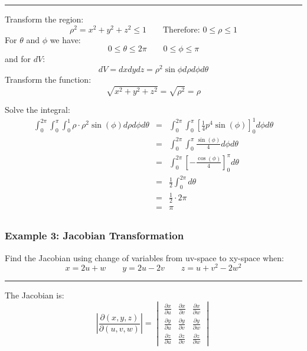 \noindent\rule{\textwidth}{1pt}

Transform the region:
$$\rho^2=x^2+y^2+z^2\leq 1\qquad \text{Therefore: }0\leq\rho\leq 1$$
For $\theta$ and $\phi$ we have:
$$0\leq\theta\leq 2\pi\qquad 0\leq\phi\leq\pi$$
and for $dV$:
$$dV=dxdydz=\rho^2\sin\phi d\rho d\phi d\theta$$
Transform the function:
$$\sqrt{x^2+y^2+z^2}=\sqrt{\rho^2}=\rho$$

Solve the integral:
\begin{eqnarray*}
  \int_0^{2\pi}\int_0^\pi\int_0^1\rho\cdot\rho^2\sin(\phi) d\rho d\phi d\theta&=&\int_0^{2\pi}\int_0^\pi\left[\frac{1}{4} p^4 \sin (\phi)\right]^1_0d\phi d\theta\\
                                                                              &=& \int_0^{2\pi}\int_0^\pi\frac{\sin (\phi)}{4}d\phi d\theta\\
                                                                              &=& \int_0^{2\pi}\left[-\frac{\cos (\phi)}{4}\right]_0^\pi d\theta\\
                                                                              &=& \frac{1}{2}\int_0^{2\pi}d\theta\\
                                                                              &=& \frac{1}{2}\cdot 2\pi\\
                                                                              &=& \boxed{\pi}\\
\end{eqnarray*}

\subsubsection{Example 3: Jacobian Transformation}
Find the Jacobian using change of variables from uv-space to xy-space when:
$$x=2u+w\qquad y=2u-2v\qquad z=u+v^2-2w^2$$

\rule{\textwidth}{1pt}

The Jacobian is:
$$\left|\frac{\partial(x,y,z)}{\partial(u,v,w)}\right|=
\begin{vmatrix}
  \frac{\partial x}{\partial u}&\frac{\partial x}{\partial v}&\frac{\partial x}{\partial w}\\
  \frac{\partial y}{\partial u}&\frac{\partial y}{\partial v}&\frac{\partial y}{\partial w}\\
  \frac{\partial z}{\partial u}&\frac{\partial z}{\partial v}&\frac{\partial z}{\partial w}
\end{vmatrix}$$

